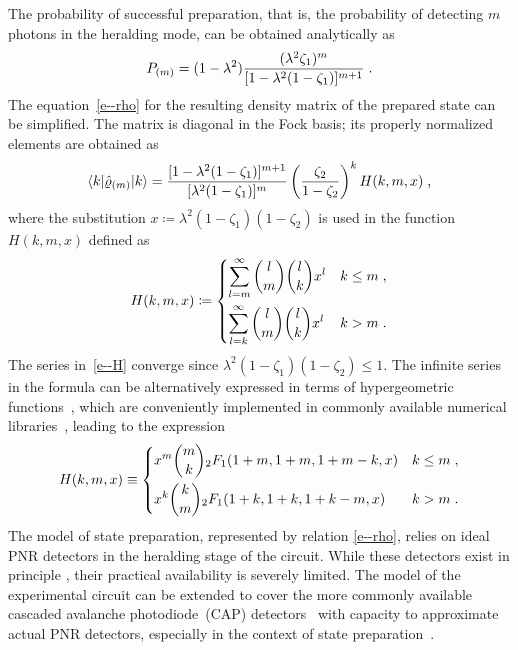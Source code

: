 \documentclass{article}
\begin{document}
The probability of successful preparation, that is, the probability of detecting $m$ photons in the heralding mode, can be obtained analytically as
%
\begin{equation}\label{e-pnr-pro}
  P_{(m)} = (1 - \lambda^{2}) 
  \frac
    { (\lambda^{2} \zeta_{1})^{m} }
    { [ 1 - \lambda^{2} (1 - \zeta_{1}) ]^{m + 1} } \;\text{.}
\end{equation}
%
The equation~\eqref{e--rho} for the resulting density matrix of the prepared state can be simplified. The matrix is diagonal in the Fock basis; its properly normalized elements are obtained as
%
\begin{equation}\label{e-pnr-rho}
  \braket{ k | \hat{\varrho}_{(m)} | k } =
  \frac
    { [ 1 - \lambda^{2} (1 - \zeta_{1}) ]^{m + 1} }
    { [ \lambda^{2} (1 - \zeta_{1}) ]^{m} }
  \left( \frac{ \zeta_{2} }{ 1 - \zeta_{2} } \right)^{k}
  H (k, m, x) \;\text{,}
\end{equation}
%
where the substitution ${x \coloneqq \lambda^{2} ( 1 - \zeta_{1} )(1 - \zeta_{2} )}$ is used in the function $H(k, m, x)$ defined as
%
\begin{equation}\label{e--H}
  H(k, m, x) \coloneq
  \begin{dcases}
    \sum_{l = m}^{\infty}
      \binom{l}{m}
      \binom{l}{k}
      x^{l} 
    & k \leq m \;\text{,} \\
    \sum_{l = k}^{\infty}
      \binom{l}{m}
      \binom{l}{k}
      x^{l}
    & k > m \;\text{.}
  \end{dcases}
\end{equation}
%
The series in~\eqref{e--H} converge since ${\lambda^{2} ( 1 - \zeta_{1} )(1 - \zeta_{2} ) \leq 1}$. The infinite series in the formula can be alternatively expressed in terms of hypergeometric functions~\cite{bateman1981}, which are conveniently implemented in commonly available numerical libraries~\cite{virtanen2020}, leading to the expression
%
\begin{equation}
  H(k, m, x) \equiv
  \begin{dcases}
    x^{m} \binom{m}{k} {}_{2}F_{1} (1 + m, 1 + m, 1 + m - k, x)
    & k \leq m \;\text{,} \\
    x^{k} \binom{k}{m} {}_{2}F_{1} (1 + k, 1 + k, 1 + k - m, x)
    & k > m \;\text{.}
  \end{dcases}
\end{equation}
%
The model of state preparation, represented by relation \eqref{e--rho}, relies on ideal PNR detectors in the heralding stage of the circuit. While these detectors exist in principle \cite{hopker2019,endo2021,endo2024}, their practical availability is severely limited. The model of the experimental circuit can be extended to cover the more commonly available cascaded avalanche photodiode~(CAP) detectors~\cite{hlousek2019,grygar2022,hlousek2024,ercolano2024} with capacity to approximate actual PNR detectors, especially in the context of state preparation~\cite{provaznik2020}.
\end{document}
